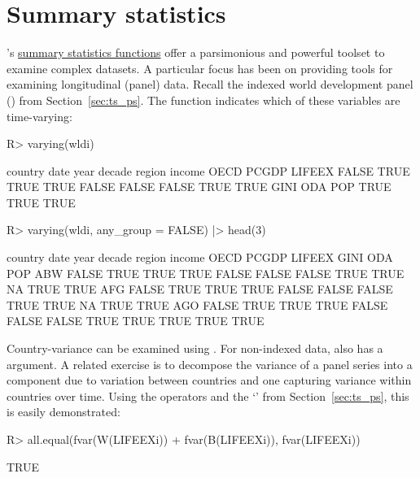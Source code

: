 \documentclass[article]{jss}
\newcommand{\class}[1]{`\code{#1}'}
\newcommand{\fct}[1]{\code{#1()}}
\begin{document}
\section{Summary statistics} \label{sec:summ_stat}
%
's \href{https://sebkrantz.github.io/collapse/reference/summary-statistics.html}{summary statistics functions} offer a parsimonious and powerful toolset to examine complex datasets. A particular focus has been on providing tools for examining longitudinal (panel) data. Recall the indexed world development panel () from Section~\ref{sec:ts_ps}. The function \fct{varying} indicates which of these variables are time-varying:
%
\begin{Schunk}
\begin{Sinput}
R> varying(wldi)
\end{Sinput}
\begin{Soutput}
country    date    year  decade  region  income    OECD   PCGDP  LIFEEX 
  FALSE    TRUE    TRUE    TRUE   FALSE   FALSE   FALSE    TRUE    TRUE 
   GINI     ODA     POP 
   TRUE    TRUE    TRUE 
\end{Soutput}
\begin{Sinput}
R> varying(wldi, any_group = FALSE) |> head(3)
\end{Sinput}
\begin{Soutput}
    country date year decade region income  OECD PCGDP LIFEEX GINI  ODA  POP
ABW   FALSE TRUE TRUE   TRUE  FALSE  FALSE FALSE  TRUE   TRUE   NA TRUE TRUE
AFG   FALSE TRUE TRUE   TRUE  FALSE  FALSE FALSE  TRUE   TRUE   NA TRUE TRUE
AGO   FALSE TRUE TRUE   TRUE  FALSE  FALSE FALSE  TRUE   TRUE TRUE TRUE TRUE
\end{Soutput}
\end{Schunk}
%
Country-variance can be examined using . For non-indexed data, \fct{varying} also has a  argument. A related exercise is to decompose the variance of a panel series into a component due to variation between countries and one capturing variance within countries over time. Using the  operators and the  \class{indexed\_series} from Section~\ref{sec:ts_ps}, this is easily demonstrated:
%
\begin{Schunk}
\begin{Sinput}
R> all.equal(fvar(W(LIFEEXi)) + fvar(B(LIFEEXi)), fvar(LIFEEXi))
\end{Sinput}
\begin{Soutput}
[1] TRUE
\end{Soutput}
\end{Schunk}
\end{document}
